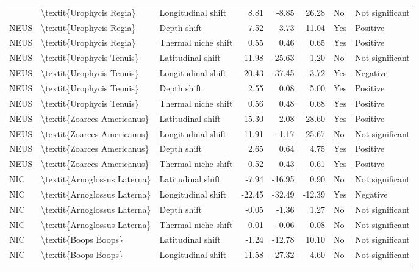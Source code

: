 \begin{longtable}[t]{lllrrrll}
{{NEUS & \textbackslash{}textit\{Urophycis Regia\} & Longitudinal shift & 8.81 & -8.85 & 26.28 & No & Not significant\\
\addlinespace
NEUS & \textbackslash{}textit\{Urophycis Regia\} & Depth shift & 7.52 & 3.73 & 11.04 & Yes & Positive\\
NEUS & \textbackslash{}textit\{Urophycis Regia\} & Thermal niche shift & 0.55 & 0.46 & 0.65 & Yes & Positive\\
NEUS & \textbackslash{}textit\{Urophycis Tenuis\} & Latitudinal shift & -11.98 & -25.63 & 1.20 & No & Not significant\\
NEUS & \textbackslash{}textit\{Urophycis Tenuis\} & Longitudinal shift & -20.43 & -37.45 & -3.72 & Yes & Negative\\
NEUS & \textbackslash{}textit\{Urophycis Tenuis\} & Depth shift & 2.55 & 0.08 & 5.00 & Yes & Positive\\
\addlinespace
NEUS & \textbackslash{}textit\{Urophycis Tenuis\} & Thermal niche shift & 0.56 & 0.48 & 0.68 & Yes & Positive\\
NEUS & \textbackslash{}textit\{Zoarces Americanus\} & Latitudinal shift & 15.30 & 2.08 & 28.60 & Yes & Positive\\
NEUS & \textbackslash{}textit\{Zoarces Americanus\} & Longitudinal shift & 11.91 & -1.17 & 25.67 & No & Not significant\\
NEUS & \textbackslash{}textit\{Zoarces Americanus\} & Depth shift & 2.65 & 0.64 & 4.75 & Yes & Positive\\
NEUS & \textbackslash{}textit\{Zoarces Americanus\} & Thermal niche shift & 0.52 & 0.43 & 0.61 & Yes & Positive\\
\addlinespace
NIC & \textbackslash{}textit\{Arnoglossus Laterna\} & Latitudinal shift & -7.94 & -16.95 & 0.90 & No & Not significant\\
NIC & \textbackslash{}textit\{Arnoglossus Laterna\} & Longitudinal shift & -22.45 & -32.49 & -12.39 & Yes & Negative\\
NIC & \textbackslash{}textit\{Arnoglossus Laterna\} & Depth shift & -0.05 & -1.36 & 1.27 & No & Not significant\\
NIC & \textbackslash{}textit\{Arnoglossus Laterna\} & Thermal niche shift & 0.01 & -0.06 & 0.08 & No & Not significant\\
NIC & \textbackslash{}textit\{Boops Boops\} & Latitudinal shift & -1.24 & -12.78 & 10.10 & No & Not significant\\
\addlinespace
NIC & \textbackslash{}textit\{Boops Boops\} & Longitudinal shift & -11.58 & -27.32 & 4.60 & No & Not significant\\
}}
\end{longtable}
